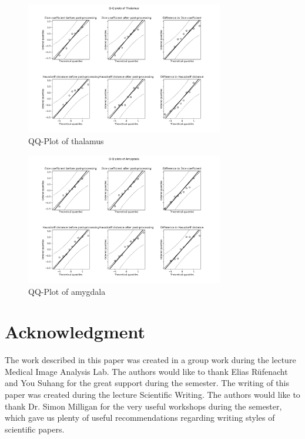 \documentclass[journal]{IEEEtran}
\begin{document}
\begin{figure}[ht]
\centering
\includegraphics[width=3.4in]{MIALab_Report/img/QQ_plots_PKF/Thalamus.png}
\caption{QQ-Plot of thalamus}
\label{fig_qq_t}
\end{figure}

\begin{figure}[ht]
\centering
\includegraphics[width=3.4in]{MIALab_Report/img/QQ_plots_PKF/Amygdala.png}
\caption{QQ-Plot of amygdala}
\label{fig_qq_a}
\end{figure}




\section*{Acknowledgment}
The work described in this paper was created in a group work during the lecture Medical Image Analysis Lab. The authors would like to thank Elias Rüfenacht and You Suhang for the great support during the semester. The writing of this paper was created during the lecture Scientific Writing. The authors would like to thank Dr. Simon Milligan for the very useful workshops during the semester, which gave us plenty of useful recommendations regarding writing styles of scientific papers.  
\end{document}
